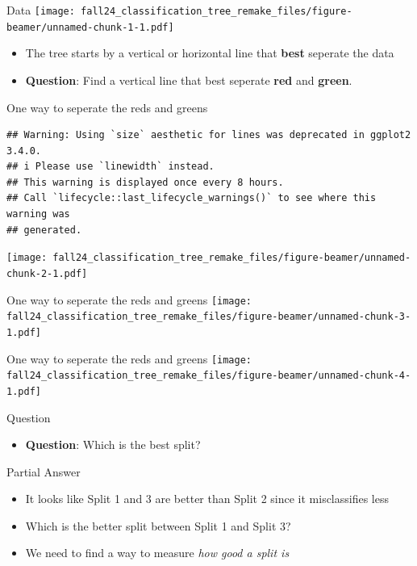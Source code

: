 \documentclass[
  ignorenonframetext,
]{beamer}
\providecommand{\tightlist}{%
  \setlength{\itemsep}{0pt}\setlength{\parskip}{0pt}}
\begin{document}
\begin{frame}{Data}
\label{data}
\texttt{[image: fall24\_classification\_tree\_remake\_files/figure-beamer/unnamed-chunk-1-1.pdf]}

\begin{itemize}
\tightlist
\item
  The tree starts by a vertical or horizontal line that \textbf{best}
  seperate the data
\item
  \textbf{Question}: Find a vertical line that best seperate
  \textbf{red} and \textbf{green}.
\end{itemize}
\end{frame}

\begin{frame}[fragile]{One way to seperate the reds and greens}
\label{one-way-to-seperate-the-reds-and-greens}
\begin{verbatim}
## Warning: Using `size` aesthetic for lines was deprecated in ggplot2 3.4.0.
## i Please use `linewidth` instead.
## This warning is displayed once every 8 hours.
## Call `lifecycle::last_lifecycle_warnings()` to see where this warning was
## generated.
\end{verbatim}

\texttt{[image: fall24\_classification\_tree\_remake\_files/figure-beamer/unnamed-chunk-2-1.pdf]}
\end{frame}

\begin{frame}{One way to seperate the reds and greens}
\label{one-way-to-seperate-the-reds-and-greens-1}
\texttt{[image: fall24\_classification\_tree\_remake\_files/figure-beamer/unnamed-chunk-3-1.pdf]}
\end{frame}

\begin{frame}{One way to seperate the reds and greens}
\label{one-way-to-seperate-the-reds-and-greens-2}
\texttt{[image: fall24\_classification\_tree\_remake\_files/figure-beamer/unnamed-chunk-4-1.pdf]}
\end{frame}

\begin{frame}{Question}
\label{question}
\begin{itemize}
\tightlist
\item
  \textbf{Question}: Which is the best split?
\end{itemize}
\end{frame}

\begin{frame}{Partial Answer}
\label{partial-answer}
\begin{itemize}
\tightlist
\item
  It looks like Split 1 and 3 are better than Split 2 since it
  misclassifies less
\item
  Which is the better split between Split 1 and Split 3?
\item
  We need to find a way to measure \emph{how good a split is}
\end{itemize}
\end{frame}
\end{document}
